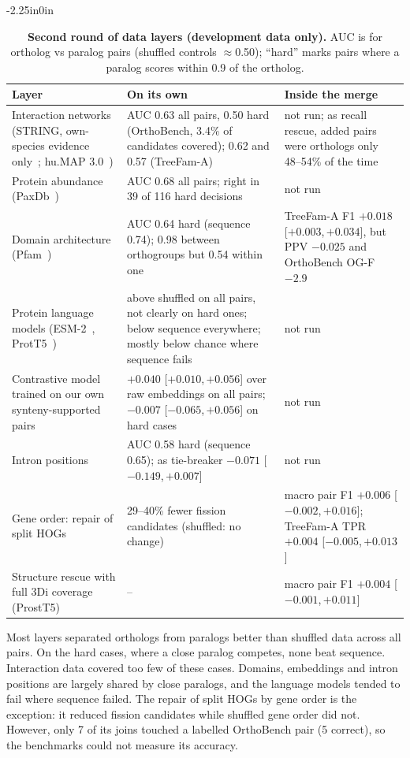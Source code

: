 \documentclass[10pt,letterpaper]{article}
\newcommand{\CI}[2]{[#1,\,#2]}
\begin{document}
\begin{table}[!ht]
\begin{adjustwidth}{-2.25in}{0in}
\centering
\caption{{\bf Second round of data layers (development data only).} AUC is for ortholog vs paralog pairs (shuffled controls $\approx$0.50); ``hard'' marks pairs where a paralog scores within 0.9 of the ortholog.}
\begin{tabular}{p{3.4cm}p{5.4cm}p{4.6cm}}
\hline
Layer & On its own & Inside the merge\\
\hline
Interaction networks (STRING, own-species evidence only~\cite{szklarczyk2023string}; hu.MAP 3.0~\cite{fischer2025humap3}) & AUC 0.63 all pairs, 0.50 hard (OrthoBench, 3.4\% of candidates covered); 0.62 and 0.57 (TreeFam-A) & not run; as recall rescue, added pairs were orthologs only 48--54\% of the time\\
Protein abundance (PaxDb~\cite{huang2023paxdb}) & AUC 0.68 all pairs; right in 39 of 116 hard decisions & not run\\
Domain architecture (Pfam~\cite{paysanlafosse2025pfam}) & AUC 0.64 hard (sequence 0.74); 0.98 between orthogroups but 0.54 within one & TreeFam-A F1 $+0.018$ \CI{$+0.003$}{$+0.034$}, but PPV $-0.025$ and OrthoBench OG-F $-2.9$\\
Protein language models (ESM-2~\cite{lin2023esm2}, ProtT5~\cite{elnaggar2022prottrans}) & above shuffled on all pairs, not clearly on hard ones; below sequence everywhere; mostly below chance where sequence fails & not run\\
Contrastive model trained on our own synteny-supported pairs & $+0.040$ \CI{$+0.010$}{$+0.056$} over raw embeddings on all pairs; $-0.007$ \CI{$-0.065$}{$+0.056$} on hard cases & not run\\
Intron positions & AUC 0.58 hard (sequence 0.65); as tie-breaker $-0.071$ \CI{$-0.149$}{$+0.007$} & not run\\
Gene order: repair of split HOGs & 29--40\% fewer fission candidates (shuffled: no change) & macro pair F1 $+0.006$ \CI{$-0.002$}{$+0.016$}; TreeFam-A TPR $+0.004$ \CI{$-0.005$}{$+0.013$}\\
Structure rescue with full 3Di coverage (ProstT5) & -- & macro pair F1 $+0.004$ \CI{$-0.001$}{$+0.011$}\\
\hline
\end{tabular}
\label{tab:layers2}
\end{adjustwidth}
\end{table}

Most layers separated orthologs from paralogs better than shuffled data across all pairs. On the hard cases, where a close paralog competes, none beat sequence. Interaction data covered too few of these cases. Domains, embeddings and intron positions are largely shared by close paralogs, and the language models tended to fail where sequence failed. The repair of split HOGs by gene order is the exception: it reduced fission candidates while shuffled gene order did not. However, only 7 of its joins touched a labelled OrthoBench pair (5 correct), so the benchmarks could not measure its accuracy.
\end{document}

